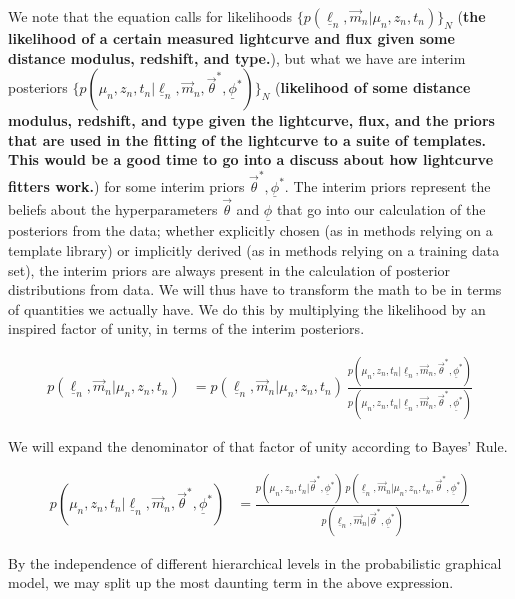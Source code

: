 \documentclass[12pt, onecolumn]{emulateapj}
\newcommand{\textul}{\underline}
\begin{document}
We note that the equation calls for likelihoods $\{p(\textul{\ell}_{n}, \vec{m}_{n} | \mu_{n}, z_{n}, t_{n})\}_{N}$ ({\bf the likelihood of a certain measured lightcurve and flux given some distance modulus, redshift, and type.}), but what we have are interim posteriors $\{p(\mu_{n}, z_{n}, t_{n} | \textul{\ell}_{n}, \vec{m}_{n}, \vec{\theta}^{*}, \textul{\phi}^{*})\}_{N}$ ({\bf likelihood of some distance modulus, redshift, and type given the lightcurve, flux, and the priors that are used in the fitting of the lightcurve to a suite of templates. This would be a good time to go into a discuss about how lightcurve fitters work.}) for some interim priors $\vec{\theta}^{*}, \textul{\phi}^{*}$.  The interim priors represent the beliefs about the hyperparameters $\vec{\theta}$ and $\textul{\phi}$ that go into our calculation of the posteriors from the data; whether explicitly chosen (as in methods relying on a template library) or implicitly derived (as in methods relying on a training data set), the interim priors are always present in the calculation of posterior distributions from data.  We will thus have to transform the math to be in terms of quantities we actually have.  We do this by multiplying the likelihood by an inspired factor of unity, in terms of the interim posteriors.

\begin{align}
p(\textul{\ell}_{n}, \vec{m}_{n} | \mu_{n}, z_{n}, t_{n}) &= p(\textul{\ell}_{n}, \vec{m}_{n} | \mu_{n}, z_{n}, t_{n})\ \frac{p(\mu_{n}, z_{n}, t_{n} | \textul{\ell}_{n}, \vec{m}_{n}, \vec{\theta}^{*}, \textul{\phi}^{*})}{p(\mu_{n}, z_{n}, t_{n} | \textul{\ell}_{n}, \vec{m}_{n}, \vec{\theta}^{*}, \textul{\phi}^{*})}
\end{align}

We will expand the denominator of that factor of unity according to Bayes' Rule.

\begin{align}
p(\mu_{n}, z_{n}, t_{n}|\textul{\ell}_{n}, \vec{m}_{n}, \vec{\theta}^{*}, \textul{\phi}^{*}) &= \frac{p(\mu_{n}, z_{n}, t_{n} | \vec{\theta}^{*}, \textul{\phi}^{*})\ p(\textul{\ell}_{n}, \vec{m}_{n} | \mu_{n}, z_{n}, t_{n}, \vec{\theta}^{*}, \textul{\phi}^{*})}{p(\textul{\ell}_{n}, \vec{m}_{n} | \vec{\theta}^{*}, \textul{\phi}^{*})}
\end{align}

By the independence of different hierarchical levels in the probabilistic graphical model, we may split up the most daunting term in the above expression.
\end{document}
